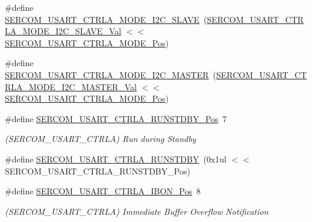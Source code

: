 \begin{DoxyCompactItemize}
\item 
\#define \mbox{\hyperlink{group___s_a_m_d21___s_e_r_c_o_m_gac96cf3bcab4b597e861cca88d114a945}{S\+E\+R\+C\+O\+M\+\_\+\+U\+S\+A\+R\+T\+\_\+\+C\+T\+R\+L\+A\+\_\+\+M\+O\+D\+E\+\_\+\+I2\+C\+\_\+\+S\+L\+A\+VE}}~(\mbox{\hyperlink{group___s_a_m_d21___s_e_r_c_o_m_ga099621515079b8fb12c776aed23ab9ee}{S\+E\+R\+C\+O\+M\+\_\+\+U\+S\+A\+R\+T\+\_\+\+C\+T\+R\+L\+A\+\_\+\+M\+O\+D\+E\+\_\+\+I2\+C\+\_\+\+S\+L\+A\+V\+E\+\_\+\+Val}} $<$$<$ \mbox{\hyperlink{group___s_a_m_d21___s_e_r_c_o_m_ga0796e7296d74a5202c5a9fc61ea9ea3b}{S\+E\+R\+C\+O\+M\+\_\+\+U\+S\+A\+R\+T\+\_\+\+C\+T\+R\+L\+A\+\_\+\+M\+O\+D\+E\+\_\+\+Pos}})
\item 
\#define \mbox{\hyperlink{group___s_a_m_d21___s_e_r_c_o_m_gabe284ea38bd0058124e793b8790bb751}{S\+E\+R\+C\+O\+M\+\_\+\+U\+S\+A\+R\+T\+\_\+\+C\+T\+R\+L\+A\+\_\+\+M\+O\+D\+E\+\_\+\+I2\+C\+\_\+\+M\+A\+S\+T\+ER}}~(\mbox{\hyperlink{group___s_a_m_d21___s_e_r_c_o_m_ga677182063fa3149dc27130337e0f5301}{S\+E\+R\+C\+O\+M\+\_\+\+U\+S\+A\+R\+T\+\_\+\+C\+T\+R\+L\+A\+\_\+\+M\+O\+D\+E\+\_\+\+I2\+C\+\_\+\+M\+A\+S\+T\+E\+R\+\_\+\+Val}} $<$$<$ \mbox{\hyperlink{group___s_a_m_d21___s_e_r_c_o_m_ga0796e7296d74a5202c5a9fc61ea9ea3b}{S\+E\+R\+C\+O\+M\+\_\+\+U\+S\+A\+R\+T\+\_\+\+C\+T\+R\+L\+A\+\_\+\+M\+O\+D\+E\+\_\+\+Pos}})
\item 
\#define \mbox{\hyperlink{group___s_a_m_d21___s_e_r_c_o_m_ga34d2008a78308b99b8a3cc7f8426ccee}{S\+E\+R\+C\+O\+M\+\_\+\+U\+S\+A\+R\+T\+\_\+\+C\+T\+R\+L\+A\+\_\+\+R\+U\+N\+S\+T\+D\+B\+Y\+\_\+\+Pos}}~7
\begin{DoxyCompactList}\small\item\em (S\+E\+R\+C\+O\+M\+\_\+\+U\+S\+A\+R\+T\+\_\+\+C\+T\+R\+LA) Run during Standby \end{DoxyCompactList}\item 
\#define \mbox{\hyperlink{group___s_a_m_d21___s_e_r_c_o_m_gac8c4bb6097257f1fd7b77c1ae2ed003b}{S\+E\+R\+C\+O\+M\+\_\+\+U\+S\+A\+R\+T\+\_\+\+C\+T\+R\+L\+A\+\_\+\+R\+U\+N\+S\+T\+D\+BY}}~(0x1ul $<$$<$ S\+E\+R\+C\+O\+M\+\_\+\+U\+S\+A\+R\+T\+\_\+\+C\+T\+R\+L\+A\+\_\+\+R\+U\+N\+S\+T\+D\+B\+Y\+\_\+\+Pos)
\item 
\#define \mbox{\hyperlink{group___s_a_m_d21___s_e_r_c_o_m_ga8c9af0e4149441c3319b0869a3f5eb79}{S\+E\+R\+C\+O\+M\+\_\+\+U\+S\+A\+R\+T\+\_\+\+C\+T\+R\+L\+A\+\_\+\+I\+B\+O\+N\+\_\+\+Pos}}~8
\begin{DoxyCompactList}\small\item\em (S\+E\+R\+C\+O\+M\+\_\+\+U\+S\+A\+R\+T\+\_\+\+C\+T\+R\+LA) Immediate Buffer Overflow Notification \end{DoxyCompactList}\item 
$$
\end{DoxyCompactItemize}

